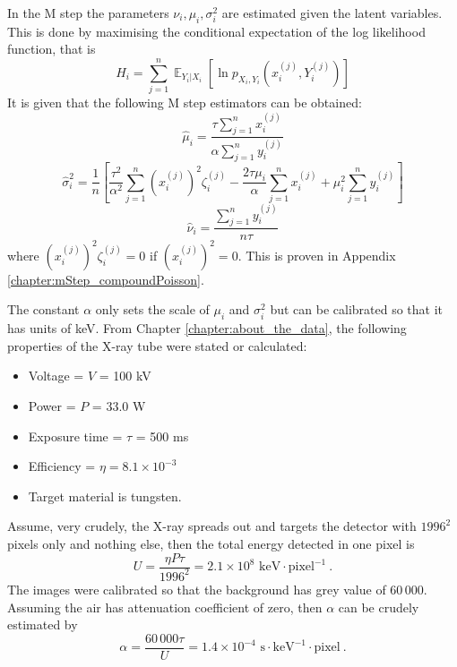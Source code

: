 \documentclass[12pt]{report}
\DeclareMathOperator{\expectation}{\mathbb{E}}
\begin{document}
In the M step the parameters $\nu_i,\mu_i,\sigma_i^2$ are estimated given the latent variables. This is done by maximising the conditional expectation of the log likelihood function, that is
\begin{equation}
H_i=\sum_{j=1}^n\expectation_{Y_i|X_i}\left[\ln p_{X_i,Y_i}\left(x_i^{(j)},Y_i^{(j)}\right)\right]
\end{equation}
It is given that the following M step estimators can be obtained:
\begin{equation}
\widehat{\mu}_i=\frac{\tau\sum_{j=1}^nx_i^{(j)}}{\alpha\sum_{j=1}^ny_i^{(j)}}
\end{equation}
\begin{equation}
\widehat{\sigma}_i^2=\frac{1}{n}\left[
\frac{\tau^2}{\alpha^2}\sum_{j=1}^n\left(x_i^{(j)}\right)^2\zeta_i^{(j)}
-\frac{2\tau\mu_i}{\alpha}\sum_{j=1}^nx_i^{(j)}
+\mu_i^2\sum_{j=1}^ny_i^{(j)}
\right]
\end{equation}
\begin{equation}
\widehat{\nu}_i=\frac{\sum_{j=1}^ny_i^{(j)}}{n\tau}
\end{equation}
where $\left(x_i^{(j)}\right)^2\zeta_i^{(j)}=0$ if $\left(x_i^{(j)}\right)^2=0$. This is proven in Appendix \ref{chapter:mStep_compoundPoisson}.

The constant $\alpha$ only sets the scale of $\mu_i$ and $\sigma_i^2$ but can be calibrated so that it has units of keV. From Chapter \ref{chapter:about_the_data}, the following properties of the X-ray tube were stated or calculated:
\begin{itemize}
	\item Voltage = $V$ = 100 kV
	\item Power = $P$ = 33.0 W
	\item Exposure time = $\tau$ = 500 ms
	\item Efficiency = $\eta = 8.1\times10^{-3}$
	\item Target material is tungsten.
\end{itemize}
Assume, very crudely, the X-ray spreads out and targets the detector with $1996^2$ pixels only and nothing else, then the total energy detected in one pixel is
\begin{equation}
U=\frac{\eta P\tau}{1996^2}=2.1\times10^{8}\text{ keV}\cdot\text{pixel}^{-1} \ .
\end{equation}
The images were calibrated so that the background has grey value of 60\,000. Assuming the air has attenuation coefficient of zero, then $\alpha$ can be crudely estimated by
\begin{equation}
\alpha = \frac{60\,000 \tau}{U} = 1.4\times10^{-4}\text{ s}\cdot\text{keV}^{-1}\cdot\text{pixel} \ .
\end{equation}
\end{document}
